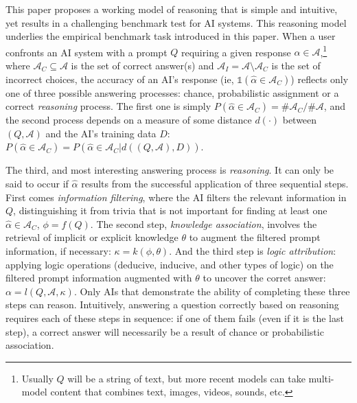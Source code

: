 \documentclass[
]{article}
\begin{document}
This paper proposes a working model of reasoning that is simple and
intuitive, yet results in a challenging benchmark test for AI systems.
This reasoning model underlies the empirical benchmark task introduced
in this paper. When a user confronts an AI system with a prompt \(Q\)
requiring a given response \(\alpha \in \mathcal{A}\),\footnote{Usually
  \(Q\) will be a string of text, but more recent models can take
  multi-model content that combines text, images, videos, sounds, etc.}
where \(\mathcal{A}_C \subseteq \mathcal{A}\) is the set of correct
answer(s) and \(\mathcal{A}_I = \mathcal{A} \setminus \mathcal{A}_C\) is
the set of incorrect choices, the accuracy of an AI's response (ie,
\(\mathbb{1}(\hat{\alpha} \in \mathcal{A}_C)\)) reflects only one of
three possible answering processes: chance, probabilistic assignment or
a correct \emph{reasoning} process. The first one is simply
\(P(\hat{\alpha} \in \mathcal{A}_C) = \#\mathcal{A}_C / \#\mathcal{A}\),
and the second process depends on a measure of some distance
\(d(\cdot)\) between \((Q, \mathcal{A})\) and the AI's training data
\(D\):
\(P(\hat{\alpha} \in \mathcal{A}_C) = P(\hat{\alpha} \in \mathcal{A}_C|d((Q, \mathcal{A}), D))\).

The third, and most interesting answering process is \emph{reasoning}.
It can only be said to occur if \(\hat{\alpha}\) results from the
successful application of three sequential steps. First comes
\emph{information filtering}, where the AI filters the relevant
information in \(Q\), distinguishing it from trivia that is not
important for finding at least one \(\hat{\alpha} \in \mathcal{A}_C\),
\(\phi = f(Q)\). The second step, \emph{knowledge association}, involves
the retrieval of implicit or explicit knowledge \(\theta\) to augment
the filtered prompt information, if necessary:
\(\kappa = k(\phi, \theta)\). And the third step is \emph{logic
attribution}: applying logic operations (deducive, inducive, and other
types of logic) on the filtered prompt information augmented with
\(\theta\) to uncover the corret answer:
\(\alpha = l(Q, \mathcal{A}, \kappa)\). Only AIs that demonstrate the
ability of completing these three steps can reason. Intuitively,
answering a question correctly based on reasoning requires each of these
steps in sequence: if one of them fails (even if it is the last step), a
correct answer will necessarily be a result of chance or probabilistic
association.
\end{document}
